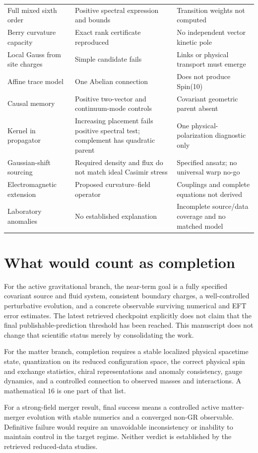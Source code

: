 \documentclass[11pt,oneside]{report}
\begin{document}
\begin{longtable}{>{\raggedright\arraybackslash}p{}>{\raggedright\arraybackslash}p{}>{\raggedright\arraybackslash}p{}}
Full mixed sixth order & Positive spectral expression and bounds & Transition weights not computed\\
Berry curvature capacity & Exact rank certificate reproduced & No independent vector kinetic pole\\
Local Gauss from site charges & Simple candidate fails & Links or physical transport must emerge\\
Affine trace model & One Abelian connection & Does not produce Spin(10)\\
Causal memory & Positive two-vector and continuum-mode controls & Covariant geometric parent absent\\
Kernel in propagator & Increasing placement fails positive spectral test; complement has quadratic parent & One physical-polarization diagnostic only\\
Gaussian-shift sourcing & Required density and flux do not match ideal Casimir stress & Specified ansatz; no universal warp no-go\\
Electromagnetic extension & Proposed curvature--field operator & Couplings and complete equations not derived\\
Laboratory anomalies & No established explanation & Incomplete source/data coverage and no matched model\\\bottomrule
\end{longtable}

\section{What would count as completion}
For the active gravitational branch, the near-term goal is a fully specified covariant source and fluid system, consistent boundary charges, a well-controlled perturbative evolution, and a concrete observable surviving numerical and EFT error estimates. The latest retrieved checkpoint explicitly does not claim that the final publishable-prediction threshold has been reached. This manuscript does not change that scientific status merely by consolidating the work.

For the matter branch, completion requires a stable localized physical spacetime state, quantization on its reduced configuration space, the correct physical spin and exchange statistics, chiral representations and anomaly consistency, gauge dynamics, and a controlled connection to observed masses and interactions. A mathematical $16$ is one part of that list.

For a strong-field merger result, final success means a controlled active matter-merger evolution with stable numerics and a converged non-GR observable. Definitive failure would require an unavoidable inconsistency or inability to maintain control in the target regime. Neither verdict is established by the retrieved reduced-data studies.
\end{document}
